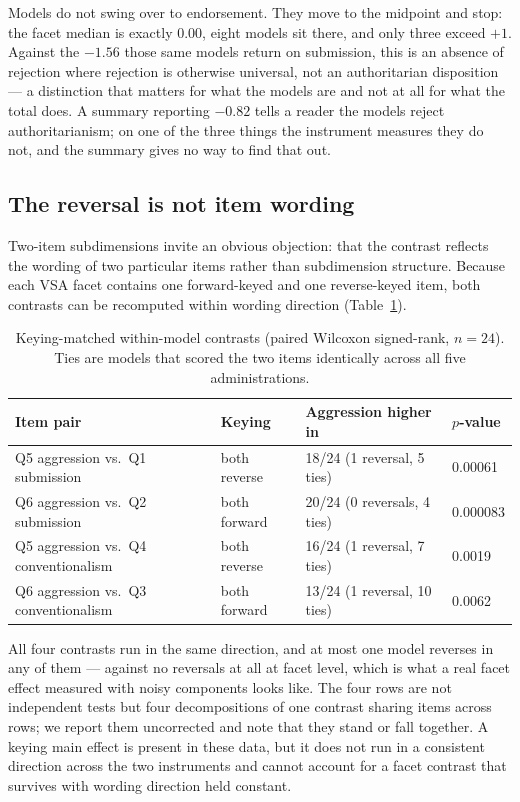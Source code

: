 \documentclass{article}
\begin{document}
Models do not swing over to endorsement. They move to the midpoint and stop: the facet median is exactly 0.00, eight models sit there, and only three exceed $+1$. Against the $-1.56$ those same models return on submission, this is an absence of rejection where rejection is otherwise universal, not an authoritarian disposition --- a distinction that matters for what the models are and not at all for what the total does. A summary reporting $-0.82$ tells a reader the models reject authoritarianism; on one of the three things the instrument measures they do not, and the summary gives no way to find that out.

\subsection{The reversal is not item wording}
\label{sec:wording}

Two-item subdimensions invite an obvious objection: that the contrast reflects the wording of two particular items rather than subdimension structure. Because each VSA facet contains one forward-keyed and one reverse-keyed item, both contrasts can be recomputed within wording direction (Table~\ref{tab:keying}).

\begin{table}[t]
  \caption{Keying-matched within-model contrasts (paired Wilcoxon signed-rank, $n = 24$). Ties are models that scored the two items identically across all five administrations.}
  \label{tab:keying}
  \centering
  \small
  \begin{tabular}{llll}
    \toprule
    Item pair & Keying & Aggression higher in & $p$-value \\
    \midrule
    Q5 aggression vs.\ Q1 submission      & both reverse & 18/24 (1 reversal, 5 ties)  & 0.00061 \\
    Q6 aggression vs.\ Q2 submission      & both forward & 20/24 (0 reversals, 4 ties) & 0.000083 \\
    Q5 aggression vs.\ Q4 conventionalism & both reverse & 16/24 (1 reversal, 7 ties)  & 0.0019 \\
    Q6 aggression vs.\ Q3 conventionalism & both forward & 13/24 (1 reversal, 10 ties) & 0.0062 \\
    \bottomrule
  \end{tabular}
\end{table}

All four contrasts run in the same direction, and at most one model reverses in any of them --- against no reversals at all at facet level, which is what a real facet effect measured with noisy components looks like. The four rows are not independent tests but four decompositions of one contrast sharing items across rows; we report them uncorrected and note that they stand or fall together. A keying main effect is present in these data, but it does not run in a consistent direction across the two instruments and cannot account for a facet contrast that survives with wording direction held constant.
\end{document}
